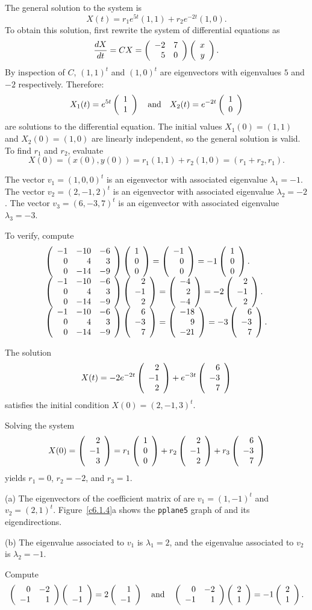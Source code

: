 \soln The general solution to the system is
\[
X(t) = r_1e^{5t}(1,1) + r_2e^{-2t}(1,0).
\]
To obtain this solution, first rewrite the system of differential
equations as
\[
\frac{dX}{dt} = CX = \left(\begin{array}{rr} -2 & 7\\ 5 &0\end{array}\right)\left(\begin{array}{r} x \\ y\end{array}\right).
\]
By inspection of $C$, $(1,1)^t$ and $(1,0)^t$ are eigenvectors with
eigenvalues $5$ and $-2$ respectively.  Therefore:
\[
X_1(t) = e^{5t}\left(\begin{array}{r} 1 \\ 1\end{array}\right) \quad\mbox{and}\quad X_2(t) = e^{-2t}\left(\begin{array}{r} 1 \\ 0\end{array}\right)
\]
are solutions to the differential equation.
The initial values $X_1(0) = (1,1)$ and $X_2(0) = (1,0)$ are linearly
independent, so the general solution is valid.
To find $r_1$ and $r_2$, evaluate
\[
X(0) = (x(0),y(0)) = r_1(1,1) + r_2(1,0) = (r_1 + r_2,r_1).
\]

\ans The vector $v_1 = (1,0,0)^t$ is an eigenvector with associated
eigenvalue $\lambda_1 = -1$.  The vector $v_2 = (2,-1,2)^t$ is an
eigenvector with associated eigenvalue $\lambda_2 = -2$.  The vector
$v_3 = (6,-3,7)^t$ is an eigenvector with associated eigenvalue
$\lambda_3 = -3$.

\soln To verify, compute
\[
\begin{array}{l}
\left(\begin{array}{rrr} -1 & -10 & -6 \\ 0 & 4 & 3 \\ 0 & -14 & -9\end{array}\right)\left(\begin{array}{r} 1 \\ 0 \\ 0\end{array}\right) =
\left(\begin{array}{r} -1 \\ 0 \\ 0\end{array}\right) = -1\left(\begin{array}{r} 1 \\ 0 \\ 0\end{array}\right). \\
\left(\begin{array}{rrr} -1 & -10 & -6 \\ 0 & 4 & 3 \\ 0 & -14 & -9\end{array}\right)\left(\begin{array}{r} 2 \\ -1 \\ 2\end{array}\right) =
\left(\begin{array}{r} -4 \\ 2 \\ -4\end{array}\right) = -2\left(\begin{array}{r} 2 \\ -1 \\ 2\end{array}\right). \\
\left(\begin{array}{rrr} -1 & -10 & -6 \\ 0 & 4 & 3 \\ 0 & -14 & -9\end{array}\right)\left(\begin{array}{r} 6 \\ -3 \\ 7\end{array}\right) =
\left(\begin{array}{r} -18 \\ 9 \\ -21\end{array}\right) = -3\left(\begin{array}{r} 6 \\ -3 \\ 7\end{array}\right).
\end{array}
\]

 \ans The solution
\[
X(t) = -2e^{-2t}\left(\begin{array}{r} 2 \\ -1 \\ 2\end{array}\right) + e^{-3t}\left(\begin{array}{r} 6 \\ -3 \\ 7\end{array}\right)
\]
satisfies the initial condition $X(0) = (2,-1,3)^t$.

\soln Solving the system
\[
X(0) = \left(\begin{array}{r} 2 \\ -1 \\ 3\end{array}\right) = r_1\left(\begin{array}{r} 1 \\ 0 \\ 0\end{array}\right) +
r_2\left(\begin{array}{r} 2 \\ -1 \\ 2\end{array}\right) + r_3\left(\begin{array}{r} 6 \\ -3 \\ 7\end{array}\right)
\]
yields $r_1 = 0$, $r_2 = -2$, and $r_3 = 1$.

(a) The eigenvectors of the coefficient matrix of  are
$v_1 = (1,-1)^t$ and $v_2 = (2,1)^t$.  Figure~\ref{c6.1.4}a shows
the {\tt pplane5} graph of  and its eigendirections.

(b) \ans The eigenvalue associated to $v_1$ is $\lambda_1 = 2$, and
the eigenvalue associated to $v_2$ is $\lambda_2 = -1$. 

\soln Compute
\[ \left(\begin{array}{rr} 0 & -2\\ -1 &1\end{array}\right)\left(\begin{array}{r} 1 \\ -1\end{array}\right) = 2\left(\begin{array}{r} 1 \\ -1\end{array}\right) \quad\mbox{and}\quad
\left(\begin{array}{rr} 0 & -2\\ -1 &1\end{array}\right)\left(\begin{array}{r} 2 \\ 1\end{array}\right) =  -1\left(\begin{array}{r} 2 \\ 1\end{array}\right). \]

